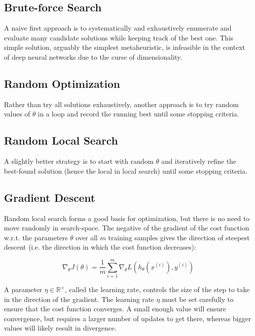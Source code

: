 \subsection{Brute-force Search}

A naive first approach is to systematically and exhaustively enumerate and evaluate many candidate solutions while keeping track of the best one. This simple solution, arguably the simplest metaheuristic, is infeasible in the context of deep neural networks due to the curse of dimensionality.

\subsection{Random Optimization}

Rather than try all solutions exhaustively, another approach is to try random values of $\theta$ in a loop and record the running best until some stopping criteria.

\subsection{Random Local Search}

A slightly better strategy is to start with random $\theta$ and iteratively refine the best-found solution (hence the local in local search) until some stopping criteria.

\subsection{Gradient Descent}

Random local search forms a good basis for optimization, but there is no need to move randomly in search-space. The negative of the gradient of the cost function w.r.t. the parameters $\theta$ over all $m$ training samples gives the direction of steepest descent (i.e. the direction in which the cost function decreases):

$$
\nabla_{\theta} J(\theta) = \frac{1}{m} \sum_{i=1}^{m} \nabla_{\theta} L(h_{\theta}(x^{(i)}), y^{(i)})
$$

A parameter $\eta \in \mathbb{{R}^{+}}$, called the learning rate, controls the size of the step to take in the direction of the gradient. The learning rate $\eta$ must be set carefully to ensure that the cost function converges. A small enough value will ensure convergence, but requires a larger number of updates to get there, whereas bigger values will likely result in divergence.

